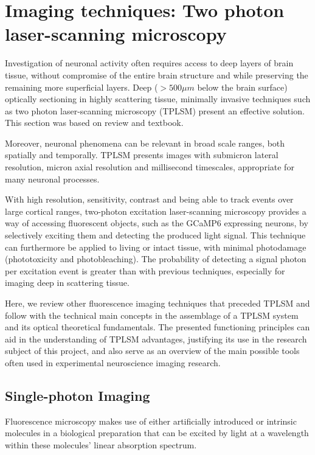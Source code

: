 \section{Imaging techniques: Two photon laser-scanning microscopy}
\label{sec:sectionc}

Investigation of neuronal activity often requires access to deep layers of brain tissue, without compromise of the entire brain structure and while preserving the remaining more superficial layers. Deep ($>500 \mu m$ below the brain surface) optically sectioning in highly scattering tissue, minimally invasive techniques such as two photon laser-scanning microscopy (TPLSM) present an effective solution. This section was based on \cite{Svoboda2006} review and \cite{Tsai} textbook.

Moreover, neuronal phenomena can be relevant in broad scale ranges, both spatially and temporally. TPLSM presents images with submicron lateral resolution, micron axial resolution and millisecond timescales, appropriate for many neuronal processes.

With high resolution, sensitivity, contrast and being able to track events over large cortical ranges, two-photon excitation laser-scanning microscopy provides a way of accessing fluorescent objects, such as the GCaMP6 expressing neurons, by selectively exciting them and detecting the produced light signal. This technique can furthermore be applied to living or intact tissue, with minimal photodamage (phototoxicity and photobleaching). The probability of detecting a signal photon per excitation event is greater than with previous techniques, especially for imaging deep in scattering tissue.

Here, we review other fluorescence imaging techniques that preceded TPLSM and follow with the technical main concepts in the assemblage of a TPLSM system and its optical theoretical fundamentals. The presented functioning principles can aid in the understanding of TPLSM advantages, justifying its use in the research subject of this project, and also serve as an overview of the main possible tools often used in experimental neuroscience imaging research.


\subsection{Single-photon Imaging}

Fluorescence microscopy makes use of either artificially introduced or intrinsic molecules in a biological preparation that can be excited by light at a wavelength within these molecules' linear absorption spectrum.

